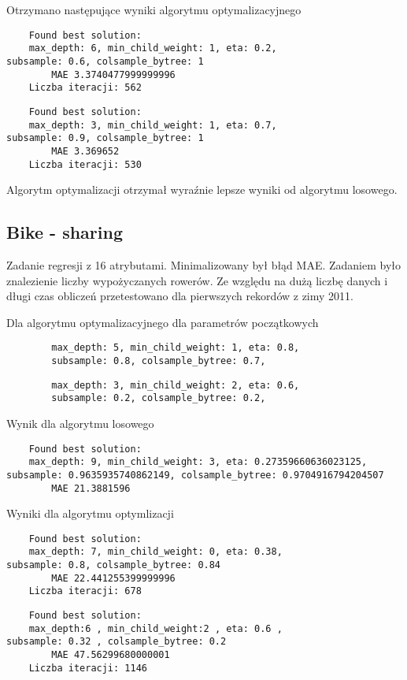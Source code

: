\documentclass[a4paper,12p]{article}
\begin{document}
	Otrzymano następujące wyniki algorytmu optymalizacyjnego
	\begin{verbatim}
	Found best solution:
	max_depth: 6, min_child_weight: 1, eta: 0.2,
subsample: 0.6, colsample_bytree: 1
        MAE 3.3740477999999996 
	Liczba iteracji: 562
	\end{verbatim}
	
	\begin{verbatim}
	Found best solution:
	max_depth: 3, min_child_weight: 1, eta: 0.7,
subsample: 0.9, colsample_bytree: 1
        MAE 3.369652
	Liczba iteracji: 530
	\end{verbatim}
	
	Algorytm optymalizacji otrzymał wyraźnie lepsze wyniki od algorytmu losowego.
	
	\subsection{Bike - sharing}
	Zadanie regresji z 16 atrybutami. Minimalizowany był błąd MAE. Zadaniem było znalezienie liczby wypożyczanych rowerów. Ze względu na dużą liczbę danych i długi czas obliczeń przetestowano dla pierwszych rekordów z zimy 2011.

	Dla algorytmu optymalizacyjnego dla parametrów początkowych
	\begin{verbatim}
		max_depth: 5, min_child_weight: 1, eta: 0.8,
		subsample: 0.8, colsample_bytree: 0.7,
	\end{verbatim}
	\begin{verbatim}
		max_depth: 3, min_child_weight: 2, eta: 0.6,
		subsample: 0.2, colsample_bytree: 0.2,
	\end{verbatim}
	
	
	Wynik dla algorytmu losowego
	\begin{verbatim}
	Found best solution:
	max_depth: 9, min_child_weight: 3, eta: 0.27359660636023125, 
subsample: 0.9635935740862149, colsample_bytree: 0.9704916794204507
        MAE 21.3881596
	\end{verbatim}
	
	Wyniki dla algorytmu optymlizacji
	\begin{verbatim}
	Found best solution:
	max_depth: 7, min_child_weight: 0, eta: 0.38,
subsample: 0.8, colsample_bytree: 0.84
        MAE 22.441255399999996
	Liczba iteracji: 678
	\end{verbatim}
	
	\begin{verbatim}
	Found best solution: 
	max_depth:6 , min_child_weight:2 , eta: 0.6 ,
subsample: 0.32 , colsample_bytree: 0.2 
        MAE 47.56299680000001
	Liczba iteracji: 1146
	\end{verbatim}
\end{document}
